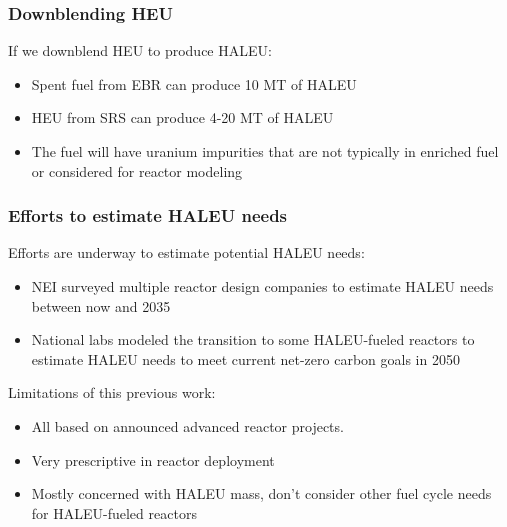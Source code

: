 \begin{frame}
    \frametitle{Downblending HEU}
    If we downblend \gls{HEU} to produce \gls{HALEU}:
    \begin{itemize}
        \item Spent fuel from \gls{EBR} can produce 10 MT of \gls{HALEU}
              \cite{nuclear_energy_institute_establishing_2022}
        \item \gls{HEU} from \gls{SRS} can produce 4-20 MT of \gls{HALEU}
              \cite{nuclear_energy_institute_establishing_2022,regalbuto_addressing_2020}
        \item<2-> The fuel will have uranium impurities that are not typically 
              in enriched fuel or considered for reactor modeling 
              \cite{nelson_foreign_2010,vaden_isotopic_2018}
    \end{itemize}
\end{frame}

\begin{frame}
    \frametitle{Efforts to estimate HALEU needs}
    Efforts are underway to estimate potential \gls{HALEU} needs:
    \begin{itemize}
        \item \gls{NEI} surveyed multiple reactor design companies
              to estimate \gls{HALEU} needs between now and 2035 
              \cite{korsnick_updated_2021,nuclear_energy_institute_establishing_2022}
        \item National labs modeled the transition to some 
              \gls{HALEU}-fueled reactors to estimate \gls{HALEU} needs 
              to meet current net-zero carbon goals in 2050 \cite{dixon_estimated_2022}
    \end{itemize}
    \pause
    Limitations of this previous work:
    \begin{itemize}
        \item All based on announced advanced reactor projects.
        \item Very prescriptive in reactor deployment
        \item<3-> Mostly concerned with \gls{HALEU} mass, don't consider 
              other fuel cycle needs for \gls{HALEU}-fueled reactors
    \end{itemize}
\end{frame}

